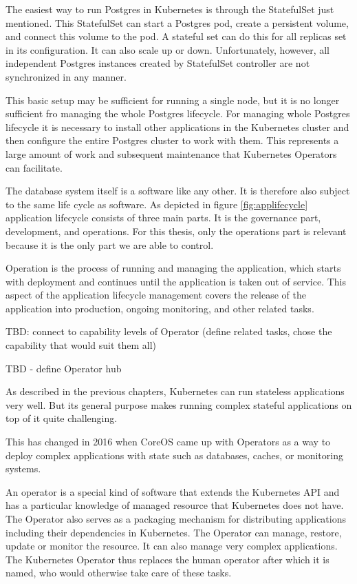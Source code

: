 The easiest way to run Postgres in Kubernetes is through the StatefulSet just mentioned. This StatefulSet can start a Postgres pod, create a persistent volume, and connect this volume to the pod. A stateful set can do this for all replicas set in its configuration. It can also scale up or down. Unfortunately, however, all independent Postgres instances created by StatefulSet controller are not synchronized in any manner.

This basic setup may be sufficient for running a single node, but it is no longer sufficient fro managing the whole Postgres lifecycle. For managing whole Postgres lifecycle it is necessary to install other applications in the Kubernetes cluster and then configure the entire Postgres cluster to work with them. This represents a large amount of work and subsequent maintenance that Kubernetes Operators can facilitate.

The database system itself is a software like any other. It is therefore also subject to the same life cycle as software.
As depicted in figure \ref{fig:applifecycle} application lifecycle consists of three main parts. It is the governance part, development, and operations. For this thesis, only the operations part is relevant because it is the only part we are able to control.

Operation is the process of running and managing the application, which starts with deployment and continues until the application is taken out of service. This aspect of the application lifecycle management covers the release of the application into production, ongoing monitoring, and other related tasks. \cite{ALM}

TBD: connect to capability levels of Operator (define related tasks, chose the capability that would suit them all)

\pagebreak
{}
TBD - define Operator hub


As described in the previous chapters, Kubernetes can run stateless applications very well. But its general purpose makes running complex stateful applications on top of it quite challenging.


This has changed in 2016 when CoreOS came up with Operators as a way to deploy complex applications with state such as databases, caches, or monitoring systems. \cite{IArchiveCOSOperators}

An operator is a special kind of software that extends the Kubernetes API and has a particular knowledge of managed resource that Kubernetes does not have. The Operator also serves as a packaging mechanism for distributing applications including their dependencies in Kubernetes. The Operator can manage, restore, update or monitor the resource. It can also manage very complex applications. The Kubernetes Operator thus replaces the human operator after which it is named, who would otherwise take care of these tasks. \cite{OperatorsPreface} \cite{IArchiveCOSOperators}

